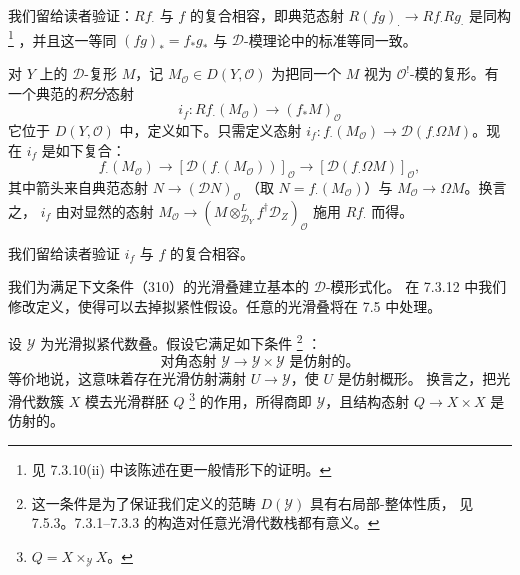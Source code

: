 我们留给读者验证：$Rf_{\cdot}$ 与 $f$ 的复合相容，即典范态射
$R(fg)_{\cdot}\to Rf_{\cdot}Rg_{\cdot}$ 是同构%
\footnote{见 7.3.10(ii) 中该陈述在更一般情形下的证明。}%
，并且这一等同 $(fg)_{*}=f_{*}g_{*}$ 与 $\mathcal{D}$-模理论中的标准等同一致。


 对 $Y$ 上的 $\mathcal{D}$-复形 $M$，记
$M_{\mathcal{O}}\in D(Y,\mathcal{O})$ 为把同一个 $M$ 视为
$\mathcal{O}^{!}$-模的复形。有一个典范的\emph{积分}态射
\begin{equation}\tag{309}
i_f:Rf_{\cdot}(M_{\mathcal{O}})\longrightarrow(f_{*}M)_{\mathcal{O}}
\end{equation}
它位于 $D(Y,\mathcal{O})$ 中，定义如下。只需定义态射
$i_f:f_{\cdot}(M_{\mathcal{O}})\to\mathcal{D}(f_{\cdot}\Omega M)$。现在 $i_f$
是如下复合：
\[
f_{\cdot}(M_{\mathcal{O}})\longrightarrow[\mathcal{D}(f_{\cdot}(M_{\mathcal{O}}))]_{\mathcal{O}}
\longrightarrow[\mathcal{D}(f_{\cdot}\Omega M)]_{\mathcal{O}},
\]
其中箭头来自典范态射 $N\to(\mathcal{D}N)_{\mathcal{O}}$
（取 $N=f_{\cdot}(M_{\mathcal{O}})$）与 $M_{\mathcal{O}}\to\Omega M$。换言之，
$i_f$ 由对显然的态射
$M_{\mathcal{O}}\to(M\otimes^{L}_{\mathcal{D}_Y}f^{\dagger}\mathcal{D}_Z)_{\mathcal{O}}$
施用 $Rf_{\cdot}$ 而得。

我们留给读者验证 $i_f$ 与 $f$ 的复合相容。



我们为满足下文条件（310）的光滑叠建立基本的 $\mathcal{D}$-模形式化。
在 7.3.12 中我们修改定义，使得可以去掉拟紧性假设。任意的光滑叠将在 7.5 中处理。

 设 $\mathcal{Y}$ 为光滑拟紧代数叠。假设它满足如下条件%
\footnote{这一条件是为了保证我们定义的范畴 $D(\mathcal{Y})$ 具有右局部-整体性质，
见 7.5.3。7.3.1--7.3.3 的构造对任意光滑代数栈都有意义。}%
：
\begin{equation}\tag{310}
\text{对角态射 }\mathcal{Y}\to\mathcal{Y}\times\mathcal{Y}\text{ 是仿射的。}
\end{equation}
等价地说，这意味着存在光滑仿射满射 $U\to\mathcal{Y}$，使 $U$ 是仿射概形。
换言之，把光滑代数簇 $X$ 模去光滑群胚 $Q$%
\footnote{$Q=X\times_{\mathcal{Y}}X$。}%
的作用，所得商即 $\mathcal{Y}$，且结构态射 $Q\to X\times X$ 是仿射的。

